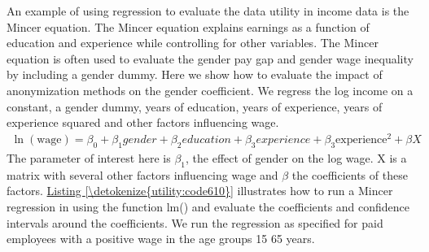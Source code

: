 \documentclass[letterpaper,10pt,english]{sphinxmanual}
\begin{document}
An example of using regression to evaluate the data utility in income
data is the Mincer equation. The Mincer equation explains earnings as a
function of education and experience while controlling for other
variables. The Mincer equation is often used to evaluate the gender pay
gap and gender wage inequality by including a gender dummy. Here we show
how to evaluate the impact of anonymization methods on the gender
coefficient. We regress the log income on a constant, a gender dummy,
years of education, years of experience, years of experience squared and
other factors influencing wage.
\begin{equation*}
\begin{split}\ln\left( \text{wage} \right) = \beta_{0} + \beta_{1}gender + \beta_{2}education + \beta_{3}experience + \beta_{3}\text{experience}^{2} + \beta X\end{split}
\end{equation*}
The parameter of interest here is \(\beta_{1}\), the effect of
gender on the log wage. X is a matrix with several other factors
influencing wage and \(\beta\) the coefficients of these factors.
\hyperref[\detokenize{utility:code610}]{Listing \ref{\detokenize{utility:code610}}} illustrates how to run a Mincer regression in  using the
function lm() and evaluate the coefficients and confidence intervals
around the coefficients. We run the regression as specified for paid
employees with a positive wage in the age groups 15 \textendash{} 65 years.
\end{document}
